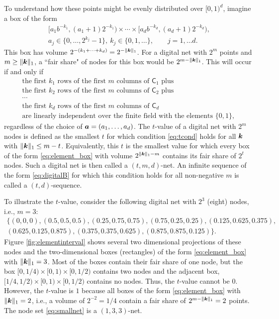 \documentclass{svproc}
\begin{document}
To understand how these points might be evenly distributed over $[0,1)^d$, imagine a box of the form
\begin{multline} \label{eq:element_box}
	[a_1 b^{-k_1}, (a_1 + 1) 2^{-k_1}) \times \cdots \times [a_d b^{-k_d}, (a_d + 1) 2^{-k_d}), \\
	a_j \in \{0, \ldots, 2^{k_j} - 1\}, \ k_j \in \{0,1, \ldots \}, \qquad j =1, \ldots d.
\end{multline}
This box has volume $2^{-(k_1 + \cdots +k_d)} = 2^{-\lVert{\boldsymbol{k}}\rVert_1}$.  For a digital net with $2^m$ points and $m \ge \lVert {\boldsymbol{k}} \rVert_1$, a ``fair share" of nodes for this box would be $2^{m- \lVert {\boldsymbol{k}} \rVert_1}$.  This will occur if and only if
\begin{multline} \label{eq:tcond}
	\text{the first $k_1$ rows of the first $m$ columns of $\mathsf{C}_1$ plus} \\
	\text{the first $k_2$ rows of the first $m$ columns of $\mathsf{C}_2$ plus} \\
	 \cdots \\
	\text{the first $k_d$ rows of the first $m$ columns of $\mathsf{C}_d$} \\
	\text{are linearly independent over the finite field with the elements $\{0,1\}$, }
\end{multline}
regardless of the choice of ${\boldsymbol{a}} = (a_1, \ldots, a_d)$.  The $t$-value of a digital net with $2^m$ nodes is defined as the smallest $t$ for which condition \eqref{eq:tcond} holds for all ${\boldsymbol{k}}$ with $\lVert {\boldsymbol{k}} \rVert_1 \le m-t$.  Equivalently, this $t$ is the smallest value for which every box of the form \eqref{eq:element_box} with volume $2^{\lVert {\boldsymbol{k}} \rVert_1 - m}$ contains its fair share of $2^t$ nodes.  Such a digital net is then called a $(t,m,d)$-net.  An infinite sequence of the form \eqref{eq:digitalB} for which this condition holds for all non-negative $m$ is called a  $(t,d)$-sequence.

To illustrate the $t$-value, consider the following digital net with $2^3$ (eight) nodes, i.e., $m = 3$:
\begin{multline} \label{eq:smallnet}
	\{(0, 0,   0),
	(0.5,   0.5,   0.5  ),
	(0.25,  0.75,  0.75 ),
	(0.75,  0.25,  0.25 ),
	(0.125, 0.625, 0.375),\\
	(0.625, 0.125, 0.875),
	(0.375, 0.375, 0.625),
	(0.875, 0.875, 0.125)\}.
\end{multline}
Figure \ref{fig:elementinterval} shows several two dimensional projections of these nodes and the two-dimensional boxes (rectangles) of the form \eqref{eq:element_box} with $\lVert{\boldsymbol{k}}\rVert_1 = 3$.  Most of the boxes contain their fair share of one node, but the box $[0,1/4) \times [0,1) \times [0,1/2)$ contains two nodes and the adjacent box, $[1/4,1/2) \times [0,1) \times [0,1/2)$ contains no nodes.  Thus, the $t$-value cannot be $0$.  However, the $t$-value is $1$ because all boxes of the form  \eqref{eq:element_box} with $\lVert{\boldsymbol{k}}\rVert_1 = 2$, i.e., a volume of $2^{-2} = 1/4$ contain a fair share of $2^{m- \lVert {\boldsymbol{k}} \rVert_1} = 2$ points.  The node set \eqref{eq:smallnet} is a $(1,3,3)$-net.
\end{document}
